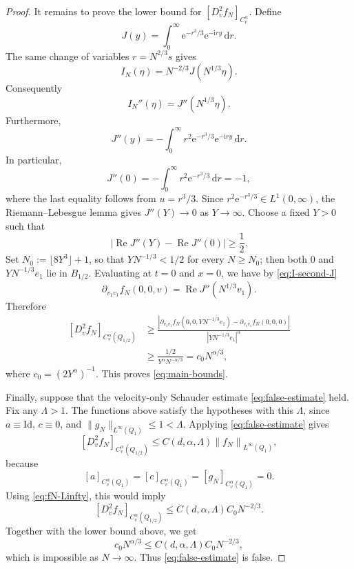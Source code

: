 \documentclass[11pt,reqno]{amsart}
\numberwithin{equation}{section}
\theoremstyle{remark}
\newcommand{\Id}{\mathrm{Id}}
\newcommand{\ii}{\mathrm{i}}
\newcommand{\e}{\mathrm{e}}
\newcommand{\dd}{\,\mathrm{d}}
\newcommand{\norm}[1]{\left\|#1\right\|}
\newcommand{\abs}[1]{\left|#1\right|}
\begin{document}
\begin{proof}
It remains to prove the lower bound for $[D_v^2f_N]_{C_v^\alpha}$.  %
Define
\begin{equation}\label{eq:J-def}
   J(y)=\int_0^\infty \e^{-r^3/3}\e^{-\ii ry}\dd r.
\end{equation}
The same change of variables $r=N^{2/3}s$ gives
\begin{equation}\label{eq:I-J-scaling}
   I_N(\eta)=N^{-2/3}J(N^{1/3}\eta).
\end{equation}
Consequently
\begin{equation}\label{eq:I-second-J}
   I_N''(\eta)=J''(N^{1/3}\eta).
\end{equation}
Furthermore,
\begin{equation}\label{eq:J-second}
   J''(y)=-\int_0^\infty r^2\e^{-r^3/3}\e^{-\ii ry}\dd r.
\end{equation}
In particular,
\begin{equation}\label{eq:J-zero}
   J''(0)=-\int_0^\infty r^2\e^{-r^3/3}\dd r=-1,
\end{equation}
where the last equality follows from $u=r^3/3$.  Since $r^2\e^{-r^3/3}\in L^1(0,\infty)$, the Riemann--Lebesgue lemma gives $J''(Y)\to0$ as $Y\to\infty$.  Choose a fixed $Y>0$ such that
\begin{equation}\label{eq:Y-choice}
   \abs{\operatorname{Re}J''(Y)-\operatorname{Re}J''(0)}\ge \frac12.
\end{equation}
Set $N_0:=\lfloor 8Y^3\rfloor+1$, so that $YN^{-1/3}<1/2$ for every $N\ge N_0$; then both $0$ and $YN^{-1/3}e_1$ lie in $B_{1/2}$.  Evaluating at $t=0$ and $x=0$, we have by \eqref{eq:I-second-J}
\[
   \partial_{v_1v_1}f_N(0,0,v)=\operatorname{Re}J''(N^{1/3}v_1).
\]
Therefore
\[
\begin{aligned}
   [D_v^2f_N]_{C_v^\alpha(Q_{1/2})}
   &\ge
   \frac{\abs{\partial_{v_1v_1}f_N(0,0,YN^{-1/3}e_1)
          -\partial_{v_1v_1}f_N(0,0,0)}}{|YN^{-1/3}e_1|^\alpha} \\
   &\ge \frac{1/2}{Y^\alpha N^{-\alpha/3}}
    =c_0N^{\alpha/3},
\end{aligned}
\]
where $c_0=(2Y^\alpha)^{-1}$.  This proves \eqref{eq:main-bounds}.

Finally, suppose that the velocity-only Schauder estimate \eqref{eq:false-estimate} held.  Fix any $\Lambda>1$.  The functions above satisfy the hypotheses with this $\Lambda$, since $a\equiv\Id$, $c\equiv0$, and $\|g_N\|_{L^\infty(Q_1)}\le1<\Lambda$.  Applying \eqref{eq:false-estimate} gives
\[
   [D_v^2f_N]_{C_v^\alpha(Q_{1/2})}
   \le C(d,\alpha,\Lambda)\norm{f_N}_{L^\infty(Q_1)},
\]
because
\[
   [a]_{C_v^\alpha(Q_1)}=[c]_{C_v^\alpha(Q_1)}=[g_N]_{C_v^\alpha(Q_1)}=0.
\]
Using \eqref{eq:fN-Linfty}, this would imply
\[
   [D_v^2f_N]_{C_v^\alpha(Q_{1/2})}\le C(d,\alpha,\Lambda)C_0N^{-2/3}.
\]
Together with the lower bound above, we get
\[
   c_0N^{\alpha/3}\le C(d,\alpha,\Lambda)C_0N^{-2/3},
\]
which is impossible as $N\to\infty$.  Thus \eqref{eq:false-estimate} is false.
\end{proof}
\end{document}
